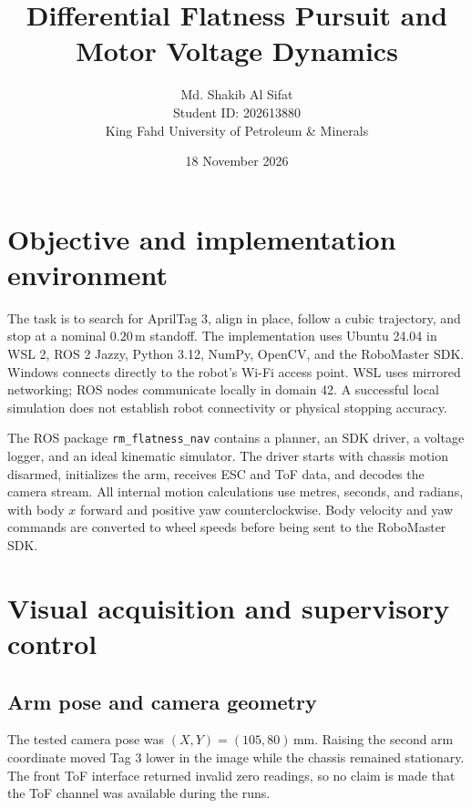 \documentclass[11pt,a4paper]{article}
\title{Differential Flatness Pursuit and\\Motor Voltage Dynamics}
\author{Md. Shakib Al Sifat\\Student ID: 202613880\\King Fahd University of Petroleum \& Minerals}
\date{18 November 2026}
\begin{document}
\maketitle
\begin{center}
\end{center}
\section{Objective and implementation environment}
The task is to search for AprilTag 3, align in place, follow a cubic trajectory, and stop at a nominal $0.20\,\mathrm{m}$ standoff. The implementation uses Ubuntu 24.04 in WSL 2, ROS 2 Jazzy, Python 3.12, NumPy, OpenCV, and the RoboMaster SDK. Windows connects directly to the robot's Wi-Fi access point. WSL uses mirrored networking; ROS nodes communicate locally in domain 42. A successful local simulation does not establish robot connectivity or physical stopping accuracy.

The ROS package \texttt{rm\_flatness\_nav} contains a planner, an SDK driver, a voltage logger, and an ideal kinematic simulator. The driver starts with chassis motion disarmed, initializes the arm, receives ESC and ToF data, and decodes the camera stream. All internal motion calculations use metres, seconds, and radians, with body $x$ forward and positive yaw counterclockwise. Body velocity and yaw commands are converted to wheel speeds before being sent to the RoboMaster SDK.

\section{Visual acquisition and supervisory control}
\subsection{Arm pose and camera geometry}
The tested camera pose was $(X,Y)=(105,80)\,\mathrm{mm}$. Raising the second arm coordinate moved Tag 3 lower in the image while the chassis remained stationary. The front ToF interface returned invalid zero readings, so no claim is made that the ToF channel was available during the runs.
\end{document}
